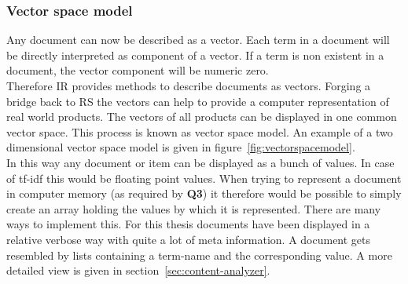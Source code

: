 \subsubsection{Vector space model}
\label{sec:vectorspacemodel}
Any document can now be described as a vector.
Each term in a document will be directly interpreted as component of a vector.
If a term is non existent in a document, the vector component will be numeric zero.\citep[p.~120]{manning:2009}\\
Therefore IR provides methods to describe documents as vectors.
Forging a bridge back to RS the vectors can help to provide a computer representation of real world products.
The vectors of all products can be displayed in one common vector space.
This process is known as vector space model.\citep[p.~120]{manning:2009}
An example of a two dimensional vector space model is given in figure~\ref{fig:vectorspacemodel}.
\\

In this way any document or item can be displayed as a bunch of values.
In case of tf-idf this would be floating point values.
When trying to represent a document in computer memory (as required by \textbf{Q3}) it therefore would be possible to simply create an array holding the values by which it is represented.
There are many ways to implement this.
For this thesis documents have been displayed in a relative verbose way with quite a lot of meta information.
A document gets resembled by lists containing a term-name and the corresponding value.
A more detailed view is given in section~\ref{sec:content-analyzer}.

